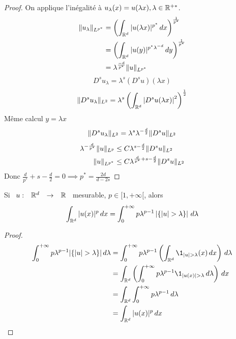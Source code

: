 \documentclass[]{report}
\begin{document}
    \begin{proof}
        On applique l'inégalité à $u_\lambda(x)=u(\lambda x),\lambda\in \mathbb{R}^{+*}$.
        \begin{align*}
            \lVert u_\lambda \rVert_{L^{p^*}}&=\left(\int_{\mathbb{R}^d}|u(\lambda x)|^{p^*}\, dx\right)^{\frac{1}{p^*}}\\
            &=\left(\int_{\mathbb{R}^d}|u(y)|^{p^*\lambda^{-d}}\, dy\right)^{\frac{1}{p^*}}\\
            &=\lambda^{\frac{-d}{p^*}}\lVert u \rVert_{L^{p^*}}
        \end{align*}
        \[D^s u_\lambda=\lambda^s( D^s u)(\lambda x)\]
        \[\lVert D^s u_\lambda \rVert_{L^2}=\lambda^s\left(\int_{\mathbb{R}^d}\left| D^s u(\lambda x)\right|^2\right)^{\frac{1}{2}}\]
        Même calcul $y=\lambda x$
        \[\lVert D^s u_\lambda \rVert_{L^2}=\lambda^s\lambda^{-\frac{d}{2}}\lVert D^s u \rVert_{L^2}\]
        \begin{align*}
            \lambda^{-\frac{d}{p^*}}\lVert u \rVert_{L^p}&\le C\lambda^{s-\frac{d}{2}}\lVert D^s u \rVert_{L^2}\\
            \lVert u \rVert_{L^{p^*}}&\le C\lambda^{\frac{d}{p^*}+s-\frac{d}{2}}\lVert D^s u \rVert_{L^2}
        \end{align*}
        Donc $\frac{d}{p^*}+s-\frac{d}{2}=0\implies p^*=\frac{2d}{d-2s}$
    \end{proof}

    \begin{lm}{}{}
        Si $\begin{array}{ccccc} u : & \mathbb{R}^d & \to & \mathbb{R} \end{array}$ mesurable, $p\in [1,+\infty[$, alors
        \[\int_{\R^d}|u(x)|^p\, dx=\int_{0}^{+\infty}p\lambda^{p-1}\left|\{|u|>\lambda\}\right|\, d\lambda\]
    \end{lm}

    \begin{proof}
        \begin{align*}
            \int_{0}^{+\infty}p\lambda^{p-1}|\{|u|>\lambda\}|\, d\lambda&=\int_{0}^{+\infty}p\lambda^{p-1}\left(\int_{\R^d} \1_{|u|>\lambda}(x)\, dx\right)\, d\lambda\\
            &=\int_{\R^d}\left(\int_{0}^{+\infty}p\lambda^{p-1}\1_{|u(x)|>\lambda}\, d\lambda \right)\, dx\\
            &=\int_{\R^d}\int_{0}^{+\infty}p\lambda^{p-1}\, d\lambda\\
            &=\int_{\R^d}|u(x)|^p\, dx
        \end{align*}
    \end{proof}
\end{document}
